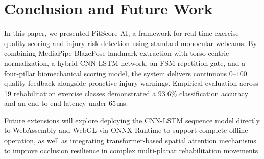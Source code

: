 \documentclass[conference]{IEEEtran}
\begin{document}
\section{Conclusion and Future Work}

In this paper, we presented FitScore AI, a framework for real-time exercise quality scoring and injury risk detection using standard monocular webcams. By combining MediaPipe BlazePose landmark extraction with torso-centric normalization, a hybrid CNN-LSTM network, an FSM repetition gate, and a four-pillar biomechanical scoring model, the system delivers continuous $0$--$100$ quality feedback alongside proactive injury warnings. Empirical evaluation across 19 rehabilitation exercise classes demonstrated a 93.6\% classification accuracy and an end-to-end latency under 65\,ms. 

Future extensions will explore deploying the CNN-LSTM sequence model directly to WebAssembly and WebGL via ONNX Runtime to support complete offline operation, as well as integrating transformer-based spatial attention mechanisms to improve occlusion resilience in complex multi-planar rehabilitation movements.



\end{document}
